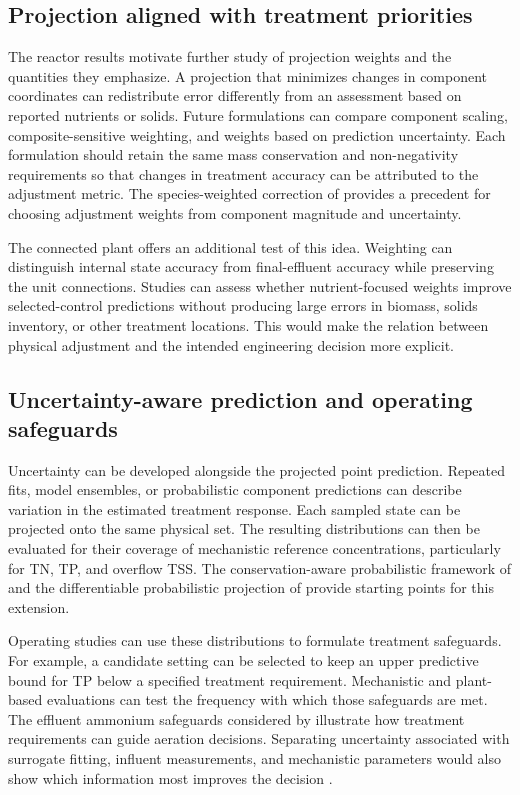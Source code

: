 \subsection{Projection aligned with treatment priorities}

The reactor results motivate further study of projection weights and the quantities they emphasize. A projection that minimizes changes in component coordinates can redistribute error differently from an assessment based on reported nutrients or solids. Future formulations can compare component scaling, composite-sensitive weighting, and weights based on prediction uncertainty. Each formulation should retain the same mass conservation and non-negativity requirements so that changes in treatment accuracy can be attributed to the adjustment metric. The species-weighted correction of \citet{SturmSilva2024} provides a precedent for choosing adjustment weights from component magnitude and uncertainty.

The connected plant offers an additional test of this idea. Weighting can distinguish internal state accuracy from final-effluent accuracy while preserving the unit connections. Studies can assess whether nutrient-focused weights improve selected-control predictions without producing large errors in biomass, solids inventory, or other treatment locations. This would make the relation between physical adjustment and the intended engineering decision more explicit.

\subsection{Uncertainty-aware prediction and operating safeguards}

Uncertainty can be developed alongside the projected point prediction. Repeated fits, model ensembles, or probabilistic component predictions can describe variation in the estimated treatment response. Each sampled state can be projected onto the same physical set. The resulting distributions can then be evaluated for their coverage of mechanistic reference concentrations, particularly for TN, TP, and overflow TSS. The conservation-aware probabilistic framework of \citet{Hansen2024} and the differentiable probabilistic projection of \citet{Utkarsh2025} provide starting points for this extension.

Operating studies can use these distributions to formulate treatment safeguards. For example, a candidate setting can be selected to keep an upper predictive bound for TP below a specified treatment requirement. Mechanistic and plant-based evaluations can test the frequency with which those safeguards are met. The effluent ammonium safeguards considered by \citet{Ren2026} illustrate how treatment requirements can guide aeration decisions. Separating uncertainty associated with surrogate fitting, influent measurements, and mechanistic parameters would also show which information most improves the decision \citep{Machado2014,Petersen2003}.

